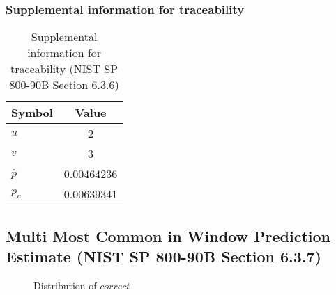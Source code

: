 \documentclass[a3paper,xelatex,english]{bxjsarticle}
\begin{document}
\subsubsection{Supplemental information for traceability}
\renewcommand{\arraystretch}{1.8}
\begin{table}[h]
\caption{Supplemental information for traceability (NIST SP 800-90B Section 6.3.6)}
\begin{center}
\begin{tabular}{|l|c|}
\hline 
\rowcolor{anotherlightblue} %
Symbol				& Value \\ \hline 
$u$				&        2\\ \hline 
$v$				&        3\\ \hline 
$\hat{p}$ 			& 0.00464236\\ \hline
$p_u$				& 0.00639341\\ \hline
\end{tabular}
\end{center}
\end{table}
\renewcommand{\arraystretch}{1.4}
\clearpage
\subsection{Multi Most Common in Window Prediction Estimate (NIST SP 800-90B Section 6.3.7)}\label{sec:NonBinary637}

\begin{figure}[htbp]
\centering

\caption{Distribution of $correct$}
\end{figure}
\end{document}
